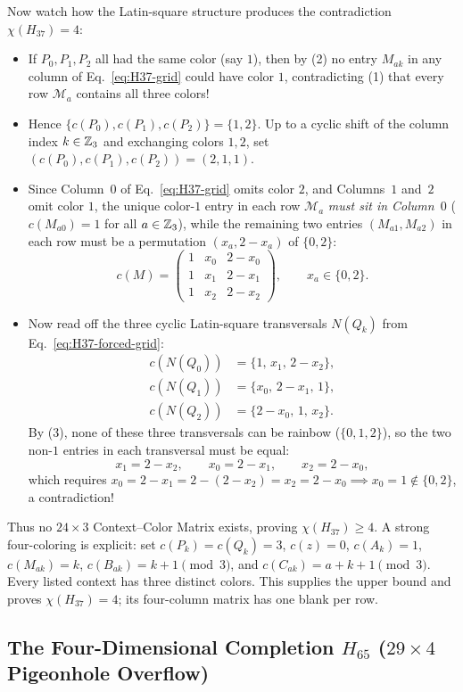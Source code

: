 \documentclass[aps,pra,reprint,superscriptaddress,longbibliography,nofootinbib,floatfix,10pt]{revtex4-2}
\theoremstyle{definition}\newtheorem{definition}[theorem]{Definition}
\theoremstyle{remark}\newtheorem{remark}[theorem]{Remark}
\begin{document}
Now watch how the Latin-square structure produces the contradiction $\chi(H_{37})=4$:
\begin{itemize}
\item If $P_0,P_1,P_2$ all had the same color (say $1$), then by (2) no entry $M_{ak}$ in any column of Eq.~\eqref{eq:H37-grid} could have color $1$, contradicting (1) that every row $\mathcal{M}_a$ contains all three colors!
\item Hence $\{c(P_0),c(P_1),c(P_2)\}=\{1,2\}$. Up to a cyclic shift of the column index $k\in\mathbb Z_3$ and exchanging colors $1,2$, set $(c(P_0),c(P_1),c(P_2))=(2,1,1)$.
\item Since Column~$0$ of Eq.~\eqref{eq:H37-grid} omits color $2$, and Columns~$1$ and~$2$ omit color $1$, the unique color-$1$ entry in each row $\mathcal{M}_a$ \emph{must sit in Column~$0$} ($c(M_{a0})=1$ for all $a\in\mathbb Z_3$), while the remaining two entries $(M_{a1},M_{a2})$ in each row must be a permutation $(x_a,2-x_a)$ of $\{0,2\}$:
\begin{equation}\label{eq:H37-forced-grid}
c(M)=\begin{pmatrix}
1 & x_0 & 2-x_0\\
1 & x_1 & 2-x_1\\
1 & x_2 & 2-x_2
\end{pmatrix},\qquad x_a\in\{0,2\}.
\end{equation}
\item Now read off the three cyclic Latin-square transversals $N(Q_k)$ from Eq.~\eqref{eq:H37-forced-grid}:
\[
\begin{aligned}
c(N(Q_0))&=\{1,\,x_1,\,2-x_2\},\\
c(N(Q_1))&=\{x_0,\,2-x_1,\,1\},\\
c(N(Q_2))&=\{2-x_0,\,1,\,x_2\}.
\end{aligned}
\]
By (3), none of these three transversals can be rainbow ($\{0,1,2\}$), so the two non-$1$ entries in each transversal must be equal:
\[
x_1=2-x_2,\qquad x_0=2-x_1,\qquad x_2=2-x_0,
\]
which requires $x_0=2-x_1=2-(2-x_2)=x_2=2-x_0\implies x_0=1\notin\{0,2\}$, a contradiction!
\end{itemize}
Thus no $24\times3$ Context--Color Matrix exists, proving $\chi(H_{37})\ge4$. A strong four-coloring is explicit: set $c(P_k)=c(Q_k)=3$, $c(z)=0$, $c(A_k)=1$, $c(M_{ak})=k$, $c(B_{ak})=k+1\pmod3$, and $c(C_{ak})=a+k+1\pmod3$. Every listed context has three distinct colors. This supplies the upper bound and proves $\chi(H_{37})=4$; its four-column matrix has one blank per row.

\subsection{The Four-Dimensional Completion \texorpdfstring{$H_{65}$}{H65} (\texorpdfstring{$29\times 4$}{29x4} Pigeonhole Overflow)}\label{sec:H65}
\end{document}
